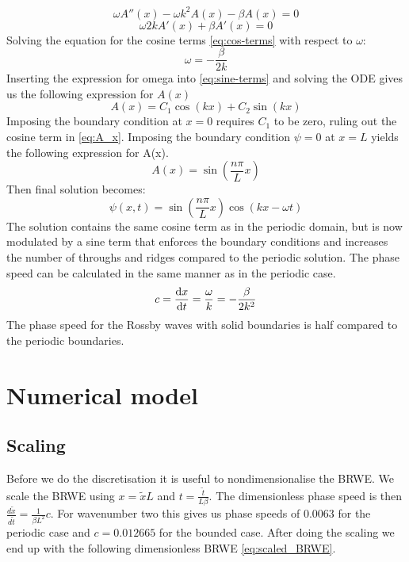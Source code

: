 \begin{equation}\label{eq:sine-terms}
    \omega A''(x) -\omega k^2 A(x) - \beta A(x) = 0
\end{equation}
\begin{equation}\label{eq:cos-terms}
    \omega 2 k A'(x) + \beta A'(x) = 0
\end{equation}
Solving the equation for the cosine terms \cref{eq:cos-terms} with respect to
$\omega$:
\begin{equation}
    \omega = -\frac{\beta}{2k}
\end{equation}
Inserting the expression for omega into \cref{eq:sine-terms} and solving the ODE
gives us the following expression for $A(x)$
\begin{equation}\label{eq:A_x}
    A(x) = C_1 \cos{(kx) + C_2 \sin{(kx)}}
\end{equation}
Imposing the boundary condition at $x=0$ requires $C_1$ to be zero, ruling
out the cosine term in \cref{eq:A_x}. Imposing the boundary condition $\psi=0$
at $x=L$ yields the following expression for A(x).
\begin{equation}
    A(x) = \sin{\left(\frac{n\pi}{L} x \right)}
\end{equation}
Then final solution becomes:
\begin{equation}
    \psi(x,t) = \sin{\left(\frac{n\pi}{L} x \right)} \cos{(kx - \omega t)}
\end{equation}
The solution contains the same cosine term as in the periodic domain, but is now
modulated by a sine term that enforces the boundary conditions and increases
the number of throughs and ridges compared to the periodic solution.
The phase speed can be calculated in the same manner as in the periodic case.
\begin{equation}
    c = \dv{x}{t} = \frac{\omega}{k} = -\frac{\beta}{2k^2}
\end{equation}
The phase speed for the Rossby waves with solid boundaries is half compared to
the periodic boundaries.



\section{Numerical model}


\subsection{Scaling}
Before we do the discretisation it is useful to nondimensionalise the BRWE.
We scale the BRWE using $x = \tilde{x} L $ and $t = \frac{\tilde{t}}{L \beta}$.
The dimensionless phase speed is then $\frac{d\tilde{x}}{d\tilde{t}} = \frac{1}
{\beta L^2} c$. For wavenumber two this gives us phase speeds of
$0.0063$ for the periodic case and $c = 0.012665$ for the bounded case.
After doing the scaling we end up with the following dimensionless BRWE
\cref{eq:scaled_BRWE}.

